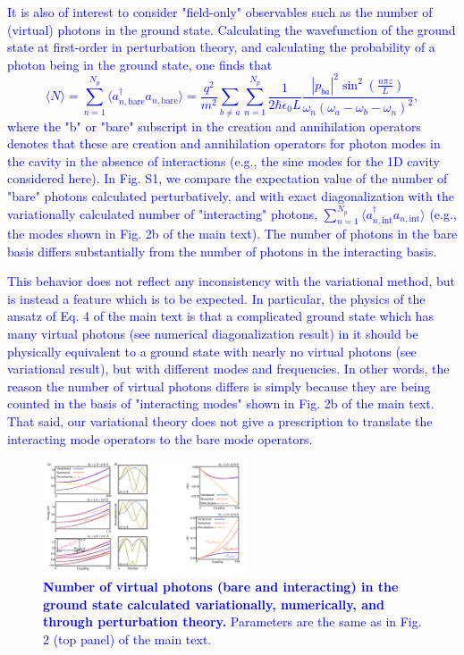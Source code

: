 \documentclass[aps,prb,onecolumn,preprint,
	groupedaddress,superscriptaddress,
	amsfonts,amssymb,amsmath,floatfix,
	citeautoscript]{revtex4-1}
\begin{document}
\textcolor{blue}{It is also of interest to consider "field-only" observables such as the number of (virtual) photons in the ground state. Calculating the wavefunction of the ground state at first-order in perturbation theory, and calculating the probability of a photon being in the ground state, one finds that 
\begin{equation}
\langle N \rangle =\sum\limits_{n=1}^{N_p} \langle a^{\dagger}_{n,\text{bare}}a_{n,\text{bare}} \rangle = \frac{q^2}{m^2} \sum\limits_{b\neq a}\sum\limits_{n=1}^{N_p} \frac{1}{2\hbar\epsilon_0L}\frac{|p_{ba}|^2\sin^2\left(\frac{n\pi z}{L}\right)}{\omega_n(\omega_a-\omega_b-\omega_n)^2},
\end{equation}
where the "b" or "bare" subscript in the creation and annihilation operators denotes that these are creation and annihilation operators for photon modes in the cavity in the absence of interactions (e.g., the sine modes for the 1D cavity considered here). In Fig. S1, we compare the expectation value of the number of "bare" photons calculated  perturbatively, and with exact diagonalization with the variationally calculated number of "interacting" photons, $\sum\limits_{n=1}^{N_p} \langle a^{\dagger}_{n,\text{int}}a_{n,\text{int}} \rangle$ (e.g., the modes shown in Fig. 2b of the main text). The number of photons in the bare basis differs substantially from the number of photons in the interacting basis.}

\textcolor{blue}{This behavior does not reflect any inconsistency with the variational method, but is instead a feature which is to be expected. In particular, the physics of the ansatz of Eq. 4 of the main text is that a complicated ground state which has many virtual photons (see numerical diagonalization result) in it should be physically equivalent to a ground state with nearly no virtual photons (see variational result), but with different modes and frequencies. In other words, the reason the number of virtual photons differs is simply because they are being counted in the basis of "interacting modes" shown in Fig. 2b of the main text.   That said, our variational theory does not give a prescription to translate the interacting mode operators to the bare mode operators.}

\begin{figure}[t]
\includegraphics[width=6cm]{FigureS1.pdf}
\caption{\textcolor{blue}{\textbf{Number of virtual photons (bare and interacting) in the ground state calculated variationally, numerically, and through perturbation theory.} Parameters are the same as in Fig. 2 (top panel) of the main text.}}
\label{fig:ansatz}
\end{figure}
\end{document}
